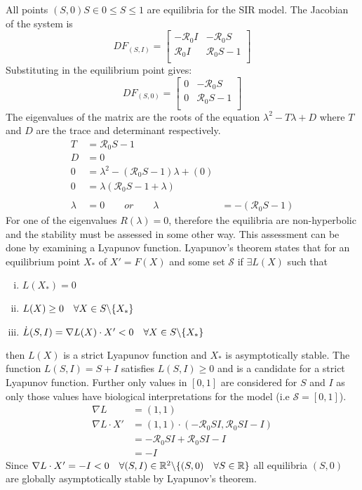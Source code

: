 All points $(S,0) S \in 0 \leq S \leq 1$ are equilibria for the SIR model.
The Jacobian of the system is
$$ DF_{(S,I)} =
\begin{bmatrix}
    -{\mathcal R_0}I & -{\mathcal R_0}S\\
     {\mathcal R_0}I &  {\mathcal R_0}S - 1\\
\end{bmatrix} $$
Substituting in the equilibrium point gives:
$$ DF_{(S,0)} =
\begin{bmatrix}
    0 & -{\mathcal R_0}S\\
    0 &  {\mathcal R_0}S - 1\\
\end{bmatrix} $$
The eigenvalues of the matrix are the roots of the equation $\lambda^2 - T\lambda + D$ where $T$ and $D$ are the trace and determinant respectively.
\begin{align*}
    T &= {\mathcal R_0}S - 1\\
    D &= 0\\
    0 &= \lambda^2 - ({\mathcal R_0}S - 1)\lambda + (0)\\
    0 &= \lambda({\mathcal R_0}S - 1 + \lambda)\\\\
    \lambda &= 0\qquad or\qquad \lambda &= -({\mathcal R_0}S - 1)
\end{align*}
For one of the eigenvalues $R(\lambda) = 0$, therefore the equilibria are non-hyperbolic and the stability must be assessed in some other way.
This assessment can be done by examining a Lyapunov function.
Lyapunov's theorem states that for an equilibrium point $X_*$ of $X'=F(X)$ and some set ${\mathcal S}$ if $\exists L(X)$ such that
\begin{enumerate}[(i)]
    \item $L(X_*) = 0$
    \item $L(X) \geq 0\quad \forall X \in S\char`\\ \{X_*\}$
    \item $\dot{L}(S,I) = \nabla L(X) \cdot X' < 0 \quad \forall X \in S\char`\\ \{X_*\}$
\end{enumerate}
then $L(X)$ is a strict Lyapunov function and $X_*$ is asymptotically stable.
The function $L(S,I) = S + I$ satisfies $L(S,I) \geq 0$ and is a candidate for a strict Lyapunov function.
Further only values in $[0,1]$ are considered for $S$ and $I$ as only those values have biological interpretations for the model (i.e ${\mathcal S} = [0,1]$).
\begin{align*}
    \nabla L &= (1,1)\\
    \nabla L \cdot X' &= (1,1)\cdot(-{\mathcal R_0}SI,{\mathcal R_0}SI-I)\\
    &=-{\mathcal R_0}SI + {\mathcal R_0}SI-I\\
    &=-I
\end{align*}
Since $\nabla L \cdot X' = -I < 0\quad \forall (S,I) \in \mathbb{R}^2\char`\\ \{(S,0)\quad \forall S \in \mathbb{R}\}$ all equilibria $(S,0)$ are globally asymptotically stable by Lyapunov's theorem.
